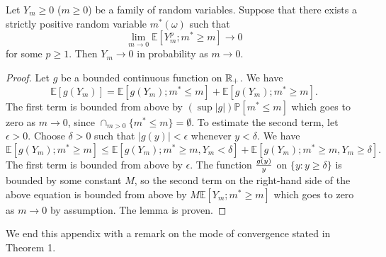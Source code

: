 
\begin{lemma}  \label{lemm}
Let $Y_m \ge 0$ ($m \ge 0$) be a family of random variables.  Suppose that there exists a strictly positive random variable $m^*(\omega)$ such that 
$$
\lim_{m \to 0}\mathbb{E} \left[Y_m^p; m^* \ge m\right] \to 0
$$
for some $p \ge 1$.  Then $Y_m \to 0$ in probability as $m \to 0$.  
\end{lemma}
\begin{proof}
Let $g$ be a bounded continuous function on $\mathbb{R}_+$.  We have
\begin{equation}
\mathbb{E} \left[g(Y_m)\right] = \mathbb{E} \left[g(Y_m); m^* \le m\right] + \mathbb{E} \left[g(Y_m); m^* \ge m\right].
\end{equation}
The first term is bounded from above by $(\sup |g|) \mathbb{P}\left[m^* \le m\right]$ which goes to zero as $m \to 0$, since $\cap_{m > 0}\{m^* \le m\} = \emptyset$.  To estimate the second term, let $\epsilon > 0$.  Choose $\delta > 0$ such that $|g(y)| < \epsilon$ whenever $y < \delta$.  We have
\begin{equation}
\mathbb{E} \left[g(Y_m); m^* \ge m\right] \le \mathbb{E} \left[g(Y_m); m^* \ge m, Y_m < \delta\right] +  \mathbb{E} \left[g(Y_m); m^* \ge m, Y_m \ge \delta\right].
\end{equation}
The first term is bounded from above by $\epsilon$.  The function ${g(y) \over y}$ on $\{y: y\ge \delta\}$ is bounded by some constant $M$, so the second term on the right-hand side of the above equation is bounded from above by $M \mathbb{E} \left[Y_m; m^* \ge m\right]$ which goes to zero as $m \to 0$ by assumption.  The lemma is proven.
\end{proof}

We end this appendix with a remark on the mode of convergence stated in Theorem 1. 


